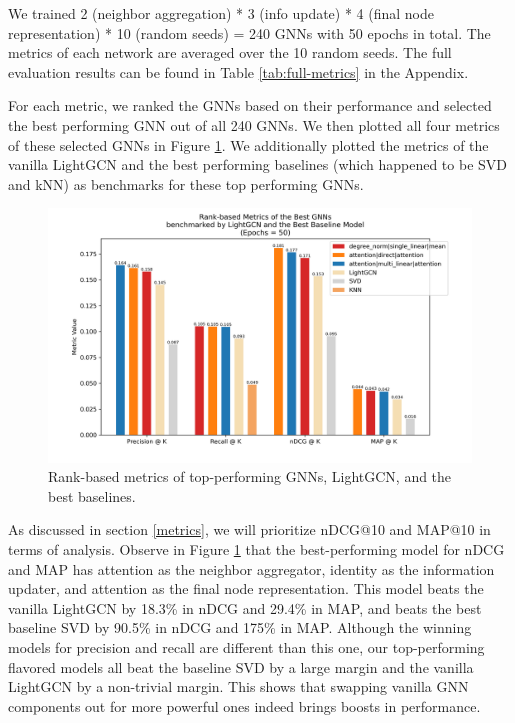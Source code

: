 \documentclass{article}
\begin{document}
We trained 2 (neighbor aggregation) * 3 (info update) * 4 (final node representation) * 10 (random seeds) = 240 GNNs with 50 epochs in total. The metrics of each network are averaged over the 10 random seeds. The full evaluation results can be found in Table \ref{tab:full-metrics} in the Appendix. 

For each metric, we ranked the GNNs based on their performance and selected the best performing GNN out of all 240 GNNs. We then plotted all four metrics of these selected GNNs in Figure \ref{fig:metrics-overall}. We additionally plotted the metrics of the vanilla LightGCN and the best performing baselines (which happened to be SVD and kNN) as benchmarks for these top performing GNNs.

\begin{figure}[h]
    \centering
    \includegraphics[width=.8\textwidth]{figs/best_models_and_baselines.png}
    \caption{Rank-based metrics of top-performing GNNs, LightGCN, and the best baselines.}
    \label{fig:metrics-overall}
\end{figure}

As discussed in section \ref{metrics}, we will prioritize nDCG@10 and MAP@10 in terms of analysis. Observe in Figure \ref{fig:metrics-overall} that the best-performing model for nDCG and MAP has attention as the neighbor aggregator, identity as the information updater, and attention as the final node representation. This model beats the vanilla LightGCN by 18.3\% in nDCG and 29.4\% in MAP, and beats the best baseline SVD by 90.5\% in nDCG and 175\% in MAP. Although the winning models for precision and recall are different than this one, our top-performing flavored models all beat the baseline SVD by a large margin and the vanilla LightGCN by a non-trivial margin. This shows that swapping vanilla GNN components out for more powerful ones indeed brings boosts in performance.
\end{document}
